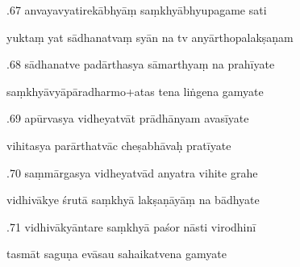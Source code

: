 \documentclass[article,12pt,a4paper]{memoir}%
\newcounter{parCount}
\begin{document}
	  
	  \pstart {}.67 anvayavyatirekābhyāṃ saṃkhyābhyupagame sati 
	{}
	\pend%
      

	  
	  \pstart \leavevmode%
	yuktaṃ yat sādhanatvaṃ syān na tv anyārthopalakṣaṇam 
	{}
	\pend%
      

	  
	  \pstart {}.68 sādhanatve padārthasya sāmarthyaṃ na prahīyate 
	{}
	\pend%
      

	  
	  \pstart \leavevmode%
	saṃkhyāvyāpāradharmo+atas tena liṅgena gamyate 
	{}
	\pend%
      

	  
	  \pstart {}.69 apūrvasya vidheyatvāt prādhānyam avasīyate 
	{}
	\pend%
      

	  
	  \pstart \leavevmode%
	vihitasya parārthatvāc cheṣabhāvaḥ pratīyate 
	{}
	\pend%
      

	  
	  \pstart {}.70 saṃmārgasya vidheyatvād anyatra vihite grahe 
	{}
	\pend%
      

	  
	  \pstart \leavevmode%
	vidhivākye śrutā saṃkhyā lakṣaṇāyāṃ na bādhyate 
	{}
	\pend%
      

	  
	  \pstart {}.71 vidhivākyāntare saṃkhyā paśor nāsti virodhinī 
	{}
	\pend%
      

	  
	  \pstart \leavevmode%
	tasmāt saguṇa evāsau sahaikatvena gamyate 
	{}
	\pend%
      
\end{document}
